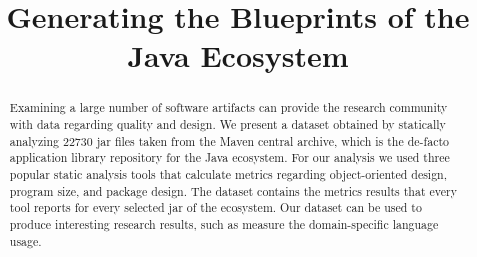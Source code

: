 \documentclass[conference]{IEEEtran}
\begin{document}
\title{Generating the Blueprints of the Java Ecosystem}

\author{

}

\maketitle

\begin{abstract}
Examining a large number of software artifacts can provide
the research community with data regarding quality and design.
We present a dataset obtained by statically analyzing
22730 {\sc jar} files taken from the Maven
central archive, which is the de-facto application library
repository for the Java ecosystem. For our analysis
we used three popular static analysis tools
that calculate metrics regarding object-oriented design,
program size, and package design.
The dataset contains the metrics results that every tool
reports for every selected {\sc jar} of the
ecosystem. Our dataset can be used to produce interesting
research results, such as measure the domain-specific language usage.
\end{abstract}
\end{document}
